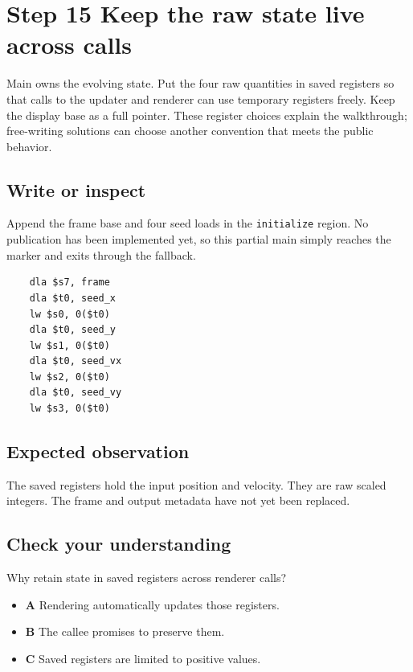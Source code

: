 \section{Step 15 Keep the raw state live across calls}\label{ball-s15}

Main owns the evolving state. Put the four raw quantities in saved registers so that calls to the updater and renderer can use temporary registers freely. Keep the display base as a full pointer. These register choices explain the walkthrough; free-writing solutions can choose another convention that meets the public behavior.

\subsection{Write or inspect}
Append the frame base and four seed loads in the \texttt{initialize} region. No publication has been implemented yet, so this partial main simply reaches the marker and exits through the fallback.

\begin{verbatim}
    dla $s7, frame
    dla $t0, seed_x
    lw $s0, 0($t0)
    dla $t0, seed_y
    lw $s1, 0($t0)
    dla $t0, seed_vx
    lw $s2, 0($t0)
    dla $t0, seed_vy
    lw $s3, 0($t0)
\end{verbatim}

\subsection{Expected observation}
The saved registers hold the input position and velocity. They are raw scaled integers. The frame and output metadata have not yet been replaced.

\subsection{Check your understanding}
Why retain state in saved registers across renderer calls?

\begin{itemize}
  \item \textbf{A} Rendering automatically updates those registers.
  \item \textbf{B} The callee promises to preserve them.
  \item \textbf{C} Saved registers are limited to positive values.
\end{itemize}
